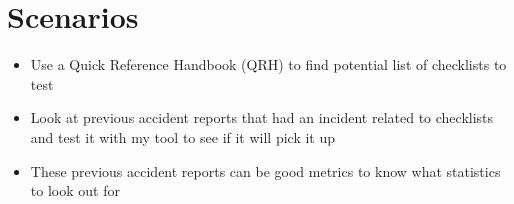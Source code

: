 \documentclass[../dissertation.tex]{subfiles}
\begin{document}
\section{Scenarios}
\begin{itemize}
  \item Use a Quick Reference Handbook (QRH) to find potential list of checklists to test
  \item Look at previous accident reports that had an incident related to checklists
    and test it with my tool to see if it will pick it up
  \item These previous accident reports can be good metrics to know what statistics to
    look out for
\end{itemize}
\end{document}
